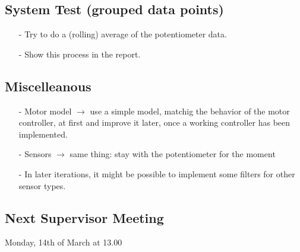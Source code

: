 \subsection{System Test (grouped data points)}
\begin{itemize}
  \item[-] Try to do a (rolling) average of the potentiometer data.
  \item[-] Show this process in the report.
\end{itemize}

\subsection{Miscelleanous}
\begin{itemize}
  \item[-] Motor model $\rightarrow$ use a simple model, matchig the behavior of the motor controller, at first and improve it later, once a working controller has been implemented.
  \item[-] Sensors $\rightarrow$ same thing: stay with the potentiometer for the moment
  \item[-] In later iterations, it might be possible to implement some filters for other sensor types.
\end{itemize}

\subsection{Next Supervisor Meeting}
Monday, 14th of March at 13.00










